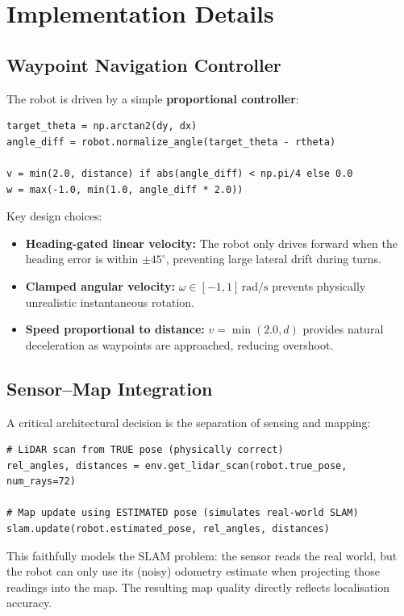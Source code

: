 \documentclass[12pt,a4paper]{article}
\begin{document}
\section{Implementation Details}

\subsection{Waypoint Navigation Controller}

The robot is driven by a simple \textbf{proportional controller}:

\begin{lstlisting}
target_theta = np.arctan2(dy, dx)
angle_diff = robot.normalize_angle(target_theta - rtheta)

v = min(2.0, distance) if abs(angle_diff) < np.pi/4 else 0.0
w = max(-1.0, min(1.0, angle_diff * 2.0))
\end{lstlisting}

Key design choices:
\begin{itemize}
    \item \textbf{Heading-gated linear velocity:} The robot only drives forward when the heading error is within \(\pm 45^\circ\), preventing large lateral drift during turns.
    \item \textbf{Clamped angular velocity:} \(\omega \in [-1, 1]\,\text{rad/s}\) prevents physically unrealistic instantaneous rotation.
    \item \textbf{Speed proportional to distance:} \(v = \min(2.0, d)\) provides natural deceleration as waypoints are approached, reducing overshoot.
\end{itemize}

\subsection{Sensor--Map Integration}

A critical architectural decision is the separation of sensing and mapping:

\begin{lstlisting}
# LiDAR scan from TRUE pose (physically correct)
rel_angles, distances = env.get_lidar_scan(robot.true_pose, num_rays=72)

# Map update using ESTIMATED pose (simulates real-world SLAM)
slam.update(robot.estimated_pose, rel_angles, distances)
\end{lstlisting}

This faithfully models the SLAM problem: the sensor reads the real world, but the robot can only use its (noisy) odometry estimate when projecting those readings into the map. The resulting map quality directly reflects localisation accuracy.
\end{document}
